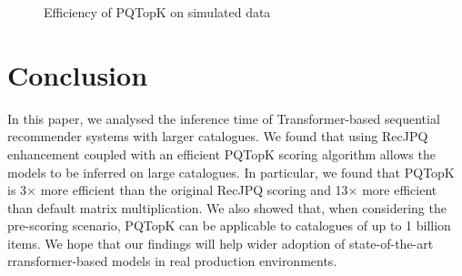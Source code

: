 \documentclass[sigconf,natbib=true, review=true]{acmart} %
\begin{document}
\begin{figure}
    \centering

    \caption{Efficiency of PQTopK on simulated data}
    \label{fig:simulate_effectiveness}
\end{figure}

\section{Conclusion}\label{sec:conclusion}
In this paper, we analysed the inference time of Transformer-based sequential recommender systems with larger catalogues.  We found that using RecJPQ enhancement coupled with an efficient PQTopK scoring algorithm allows the models to be inferred on large catalogues. In particular, we found that PQTopK is 3$\times$ more efficient than the original RecJPQ scoring and 13$\times$ more efficient than default matrix multiplication. We also showed that, when considering the pre-scoring scenario, PQTopK can be applicable to catalogues of up to 1 billion items. We hope that our findings will help wider adoption of state-of-the-art rransformer-based models in real production environments. 
\end{document}
